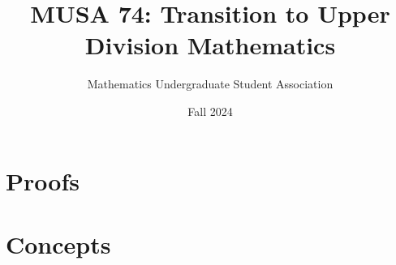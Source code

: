 \documentclass[openany]{book}
\title{MUSA 74: Transition to Upper Division Mathematics}
\author{Mathematics Undergraduate Student Association}
\date{Fall 2024}
\begin{document}
\setcounter{chapter}{-1}


\part{Proofs}





\part{Concepts}




\nirprintbib
\nirprintindex
\end{document}
